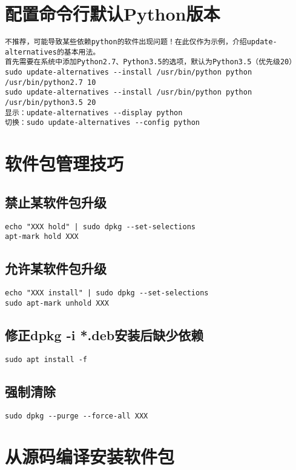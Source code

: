 \documentclass[a4paper,fontset=fandol,zihao=-4,linespread=1.2]{ctexbook}
\begin{document}
\section{配置命令行默认Python版本}
\begin{lstlisting}
不推荐，可能导致某些依赖python的软件出现问题！在此仅作为示例，介绍update-alternatives的基本用法。
首先需要在系统中添加Python2.7、Python3.5的选项，默认为Python3.5（优先级20）
sudo update-alternatives --install /usr/bin/python python /usr/bin/python2.7 10
sudo update-alternatives --install /usr/bin/python python /usr/bin/python3.5 20
显示：update-alternatives --display python
切换：sudo update-alternatives --config python
\end{lstlisting}

\section{软件包管理技巧}

\subsection{禁止某软件包升级}
\begin{lstlisting}
echo "XXX hold" | sudo dpkg --set-selections
apt-mark hold XXX
\end{lstlisting}

\subsection{允许某软件包升级}
\begin{lstlisting}
echo "XXX install" | sudo dpkg --set-selections
sudo apt-mark unhold XXX
\end{lstlisting}

\subsection{修正dpkg -i *.deb安装后缺少依赖}
\begin{lstlisting}
sudo apt install -f
\end{lstlisting}

\subsection{强制清除}
\begin{lstlisting}
sudo dpkg --purge --force-all XXX
\end{lstlisting}

\section{从源码编译安装软件包}
\end{document}
